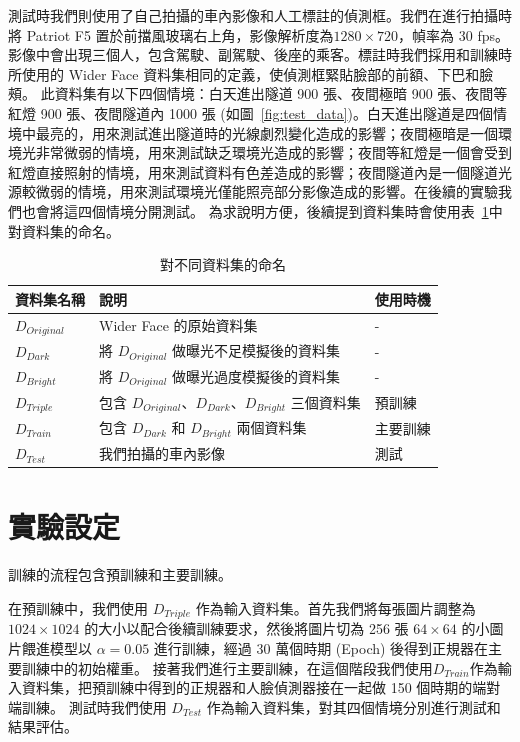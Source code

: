 測試時我們則使用了自己拍攝的車內影像和人工標註的偵測框。我們在進行拍攝時將 Patriot F5 置於前擋風玻璃右上角，影像解析度為$1280 \times 720$，幀率為 30 fps。影像中會出現三個人，包含駕駛、副駕駛、後座的乘客。標註時我們採用和訓練時所使用的 Wider Face 資料集相同的定義，使偵測框緊貼臉部的前額、下巴和臉頰。
此資料集有以下四個情境：白天進出隧道 900 張、夜間極暗 900 張、夜間等紅燈 900 張、夜間隧道內 1000 張 (如圖~\ref{fig:test_data})。白天進出隧道是四個情境中最亮的，用來測試進出隧道時的光線劇烈變化造成的影響；夜間極暗是一個環境光非常微弱的情境，用來測試缺乏環境光造成的影響；夜間等紅燈是一個會受到紅燈直接照射的情境，用來測試資料有色差造成的影響；夜間隧道內是一個隧道光源較微弱的情境，用來測試環境光僅能照亮部分影像造成的影響。在後續的實驗我們也會將這四個情境分開測試。
為求說明方便，後續提到資料集時會使用表~\ref{table:model_names}中對資料集的命名。
\begin{table}[ht]
    \caption{對不同資料集的命名}
    \centering
    \begin{tabular}{l l l}
        \hline
        資料集名稱 & 說明 & 使用時機 \\
        \hline
        $D_{Original}$ & Wider Face 的原始資料集 & - \\
        $D_{Dark}$ & 將 $D_{Original}$ 做曝光不足模擬後的資料集 & - \\
        $D_{Bright}$ & 將 $D_{Original}$ 做曝光過度模擬後的資料集 & - \\
        $D_{Triple}$ & 包含 $D_{Original}$、$D_{Dark}$、$D_{Bright}$ 三個資料集 & 預訓練 \\
        $D_{Train}$	& 包含 $D_{Dark}$ 和 $D_{Bright}$ 兩個資料集 & 主要訓練 \\
        $D_{Test}$ & 我們拍攝的車內影像 & 測試 \\
        \hline
    \end{tabular}
    \label{table:model_names}
\end{table}

\section{實驗設定}

訓練的流程包含預訓練和主要訓練。

在預訓練中，我們使用 $D_{Triple}$ 作為輸入資料集。首先我們將每張圖片調整為 $1024 \times 1024$ 的大小以配合後續訓練要求，然後將圖片切為 256 張 $64 \times 64$ 的小圖片餵進模型以 $\alpha = 0.05$ 進行訓練，經過 30 萬個時期 (Epoch) 後得到正規器在主要訓練中的初始權重。
接著我們進行主要訓練，在這個階段我們使用$D_{Train}$作為輸入資料集，把預訓練中得到的正規器和人臉偵測器接在一起做 150 個時期的端對端訓練。
測試時我們使用 $D_{Test}$ 作為輸入資料集，對其四個情境分別進行測試和結果評估。


